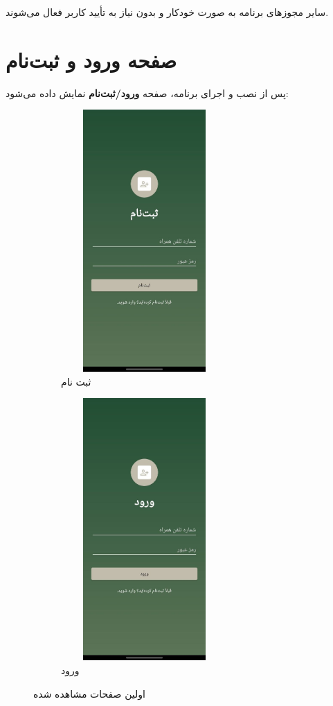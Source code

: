 \documentclass{report}
\begin{document}
سایر مجوزهای برنامه به صورت خودکار و بدون نیاز به تأیید کاربر فعال می‌شوند.

\section{صفحه ورود و ثبت‌نام}

پس از نصب و اجرای برنامه، صفحه \textbf{ورود/ثبت‌نام} نمایش داده می‌شود:
\begin{figure}[ht]
	\centering
	\begin{subfigure}[b]{0.3\textwidth}\centering
		\includegraphics[width=0.7\textwidth,height=10cm,keepaspectratio]{Pic/signup}
		\caption{ثبت نام}
		\label{fig:signup}
	\end{subfigure}
	\begin{subfigure}[b]{0.3\textwidth}\centering
		\includegraphics[width=0.7\textwidth,height=10cm,keepaspectratio]{Pic/login}
		\caption{ورود}
		\label{fig:login}
	\end{subfigure}
	\caption{اولین صفحات مشاهده شده}
	\label{fig:animals}
\end{figure}
\end{document}

